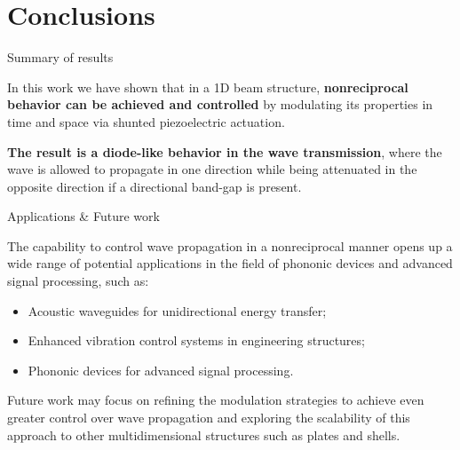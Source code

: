 \section{Conclusions}

\begin{frame}{Summary of results}

    In this work we have shown that in a 1D beam structure, \textbf{nonreciprocal behavior can be achieved and controlled} by modulating its properties in time and space via shunted piezoelectric actuation.

    \vspace{9pt}

    \textbf{The result is a diode-like behavior in the wave transmission}, where the wave is allowed to propagate in one direction while being attenuated in the opposite direction if a directional band-gap is present.

\end{frame}



\begin{frame}{Applications \& Future work}

    The capability to control wave propagation in a nonreciprocal manner opens up a wide range of potential applications in the field of phononic devices and advanced signal processing, such as:

    \begin{itemize}
        \item Acoustic waveguides for unidirectional energy transfer;
        \item Enhanced vibration control systems in engineering structures;
        \item Phononic devices for advanced signal processing.
    \end{itemize}

    \vspace{9pt}

    Future work may focus on refining the modulation strategies to achieve even greater control over wave propagation and exploring the scalability of this approach to other multidimensional structures such as plates and shells.

\end{frame}
